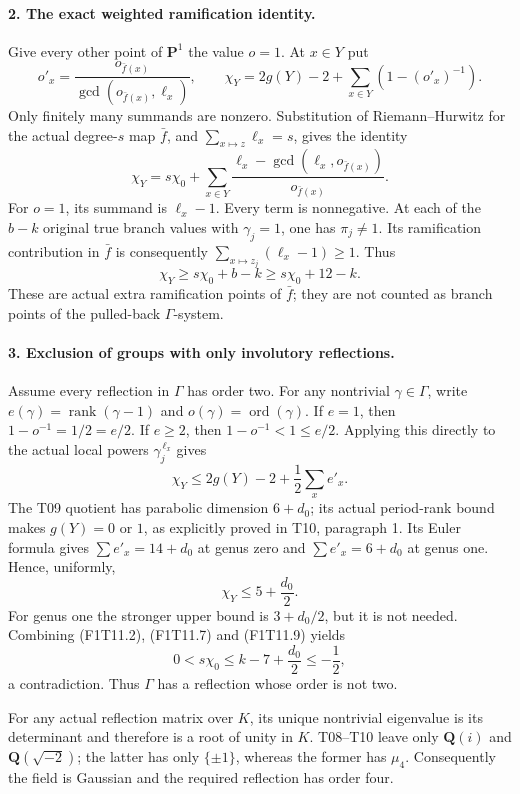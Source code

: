 \paragraph{2. The exact weighted ramification identity.}
Give every other point of \(\mathbf P^1\) the value \(o=1\).
At \(x\in Y\) put
\[
 o'_x=\frac{o_{\bar f(x)}}{\gcd(o_{\bar f(x)},\ell_x)},\qquad
 \chi_Y=2g(Y)-2+\sum_{x\in Y}(1-(o'_x)^{-1}).
 \tag{F1T11.5}
\]
Only finitely many summands are nonzero. Substitution of
Riemann--Hurwitz for the actual degree-\(s\) map
\(\bar f\), and \(\sum_{x\mapsto z}\ell_x=s\), gives
the identity
\[
 \chi_Y=s\chi_0+
  \sum_{x\in Y}
    \frac{\ell_x-\gcd(\ell_x,o_{\bar f(x)})}
         {o_{\bar f(x)}} .
 \tag{F1T11.6}
\]
For \(o=1\), its summand is \(\ell_x-1\).
Every term is nonnegative. At each of the \(b-k\)
original true branch values with \(\gamma_j=1\),
one has \(\pi_j\ne1\). Its ramification contribution
in \(\bar f\) is consequently
\(\sum_{x\mapsto z_j}(\ell_x-1)\ge1\). Thus
\[
                    \chi_Y\ge s\chi_0+b-k
                                 \ge s\chi_0+12-k.
 \tag{F1T11.7}
\]
These are actual extra ramification points of \(\bar f\);
they are not counted as branch points of the pulled-back
\(\Gamma\)-system.

\paragraph{3. Exclusion of groups with only involutory reflections.}
Assume every reflection in \(\Gamma\) has order two.
For any nontrivial \(\gamma\in\Gamma\), write
\(e(\gamma)=\operatorname{rank}(\gamma-1)\) and
\(o(\gamma)=\operatorname{ord}(\gamma)\). If \(e=1\),
then \(1-o^{-1}=1/2=e/2\). If \(e\ge2\), then
\(1-o^{-1}<1\le e/2\). Applying this directly to the
actual local powers \(\gamma_j^{\,\ell_x}\) gives
\[
             \chi_Y\le2g(Y)-2+\frac12\sum_x e'_x .
 \tag{F1T11.8}
\]
The T09 quotient has parabolic dimension \(6+d_0\);
its actual period-rank bound makes \(g(Y)=0\) or \(1\),
as explicitly proved in T10, paragraph 1. Its Euler formula
gives \(\sum e'_x=14+d_0\) at genus zero and
\(\sum e'_x=6+d_0\) at genus one. Hence, uniformly,
\[
                  \chi_Y\le5+\frac{d_0}{2}.
 \tag{F1T11.9}
\]
For genus one the stronger upper bound is
\(3+d_0/2\), but it is not needed.
Combining (F1T11.2), (F1T11.7) and (F1T11.9) yields
\[
 0<s\chi_0
       \le k-7+\frac{d_0}{2}
       \le-\frac12,
 \tag{F1T11.10}
\]
a contradiction. Thus \(\Gamma\) has a reflection whose
order is not two.

For any actual reflection matrix over \(K\), its unique
nontrivial eigenvalue is its determinant and therefore is
a root of unity in \(K\). T08--T10 leave only
\(\mathbf Q(i)\) and \(\mathbf Q(\sqrt{-2})\); the latter
has only \(\{\pm1\}\), whereas the former has \(\mu_4\).
Consequently the field is Gaussian and the required
reflection has order four.

